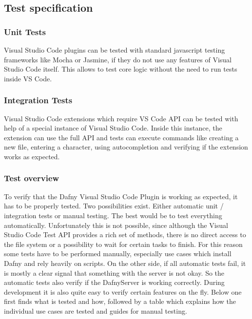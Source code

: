 \subsection{Test specification}

\subsubsection{Unit Tests}
Visual Studio Code plugins can be tested with standard javascript testing frameworks like Mocha or Jasmine, if they do not use any features of Visual Studio Code itself. This allows to test core logic without the need to run tests inside VS Code.

\subsubsection{Integration Tests}
Visual Studio Code extensions which require VS Code API can be tested with help of a special instance of Visual Studio Code. Inside this instance, the extension can use the full API and tests can execute commands like creating a new file, entering a character, using autocompletion and verifying if the extension works as expected.   

\subsubsection{Test overview}
To verify that the Dafny Visual Studio Code Plugin is working as expected, it has to be properly tested. Two possibilities exist. Either automatic unit / integration tests or manual testing. The best would be to test everything automatically. Unfortunately this is not possible, since although the Visual Studio Code Test API provides a rich set of methods, there is no direct access to the file system or a possibility to wait for certain tasks to finish. For this reason some tests have to be performed manually, especially use cases which install Dafny and rely heavily on scripts. On the other side, if all automatic tests fail, it is mostly a clear signal that something with the server is not okay. So the automatic tests also verify if the DafnyServer is working correctly. During development it is also quite easy to verify certain features on the fly. 
Below one first finds what is tested and how, followed by a table which explains how the individual use cases are tested and guides for manual testing. 

